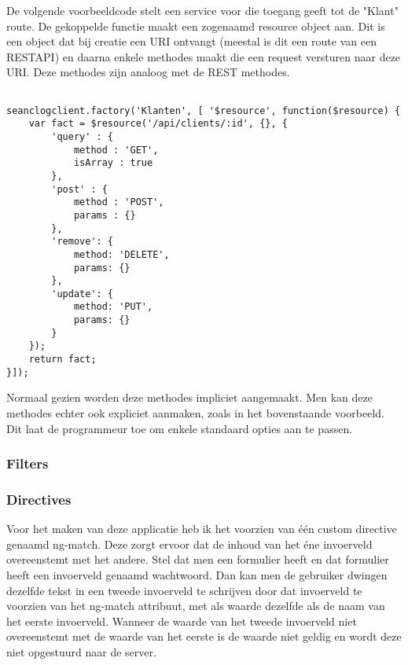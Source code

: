 \documentclass[a4paper,11pt]{article}
\begin{document}
De volgende voorbeeldcode stelt een service voor die toegang geeft tot de "Klant" route. De gekoppelde functie maakt een zogenaamd resource object aan. Dit is een object dat bij creatie een URI ontvangt (meestal is dit een route van een RESTAPI) en daarna enkele methodes maakt die een request versturen naar deze URI. Deze methodes zijn analoog met de REST methodes.
\begin{lstlisting}

seanclogclient.factory('Klanten', [ '$resource', function($resource) {
	var fact = $resource('/api/clients/:id', {}, {
		'query' : {
			method : 'GET',
			isArray : true
		},
		'post' : {
			method : 'POST',
			params : {}
		},
		'remove': {
			method: 'DELETE',
			params: {}
		},
		'update': {
			method: 'PUT',
			params: {}
		}
	});
	return fact;
}]);

\end{lstlisting}

Normaal gezien worden deze methodes impliciet aangemaakt. Men kan deze methodes echter ook expliciet aanmaken, zoals in het bovenstaande voorbeeld. Dit laat de programmeur toe om enkele standaard opties aan te passen.

\subsubsection{Filters}

\subsubsection{Directives}
Voor het maken van deze applicatie heb ik het voorzien van één custom directive genaamd ng-match. Deze zorgt ervoor dat de inhoud van het éne invoerveld overeenstemt met het andere. Stel dat men een formulier heeft en dat formulier heeft een invoerveld genaamd wachtwoord. Dan kan men de gebruiker dwingen dezelfde tekst in een tweede invoerveld te schrijven door dat invoerveld te voorzien van het ng-match attribuut, met als waarde dezelfde als de naam van het eerste invoerveld. Wanneer de waarde van het tweede invoerveld niet overeenstemt met de waarde van het eerste is de waarde niet geldig en wordt deze niet opgestuurd naar de server.
\end{document}
